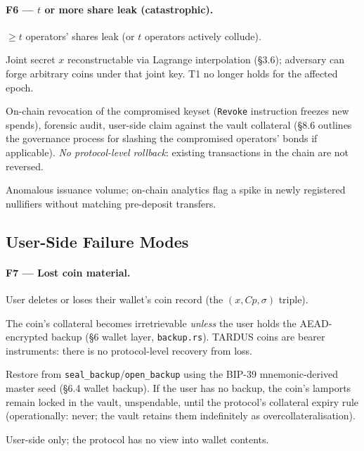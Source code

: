 \paragraph{F6 --- $t$ or more share leak (catastrophic).}
\begin{description}[leftmargin=2em,style=nextline,itemsep=0pt]
  \item[Trigger] $\geq t$ operators' shares leak (or $t$ operators
    actively collude).
  \item[Consequence] Joint secret $x$ reconstructable via Lagrange
    interpolation (\S3.6); adversary can forge arbitrary coins
    under that joint key. T1 no longer holds for the affected epoch.
  \item[Recovery] On-chain revocation of the compromised keyset
    (\texttt{Revoke} instruction freezes new spends), forensic audit,
    user-side claim against the vault collateral (\S8.6 outlines the
    governance process for slashing the compromised operators' bonds
    if applicable). \emph{No protocol-level rollback}: existing
    transactions in the chain are not reversed.
  \item[Detection] Anomalous issuance volume; on-chain analytics flag
    a spike in newly registered nullifiers without matching
    pre-deposit transfers.
\end{description}

\subsection{User-Side Failure Modes}
\label{sec:failure-user}

\paragraph{F7 --- Lost coin material.}
\begin{description}[leftmargin=2em,style=nextline,itemsep=0pt]
  \item[Trigger] User deletes or loses their wallet's coin record
    (the $(x, Cp, \sigma)$ triple).
  \item[Consequence] The coin's collateral becomes irretrievable
    \emph{unless} the user holds the AEAD-encrypted backup
    (\S6 wallet layer, \texttt{backup.rs}). TARDUS coins are bearer
    instruments: there is no protocol-level recovery from loss.
  \item[Recovery] Restore from \texttt{seal\_backup}/\texttt{open\_backup}
    using the BIP-39 mnemonic-derived master seed (\S6.4 wallet
    backup). If the user has no backup, the coin's lamports remain
    locked in the vault, unspendable, until the protocol's collateral
    expiry rule (operationally: never; the vault retains them
    indefinitely as overcollateralisation).
  \item[Detection] User-side only; the protocol has no view into
    wallet contents.
\end{description}

